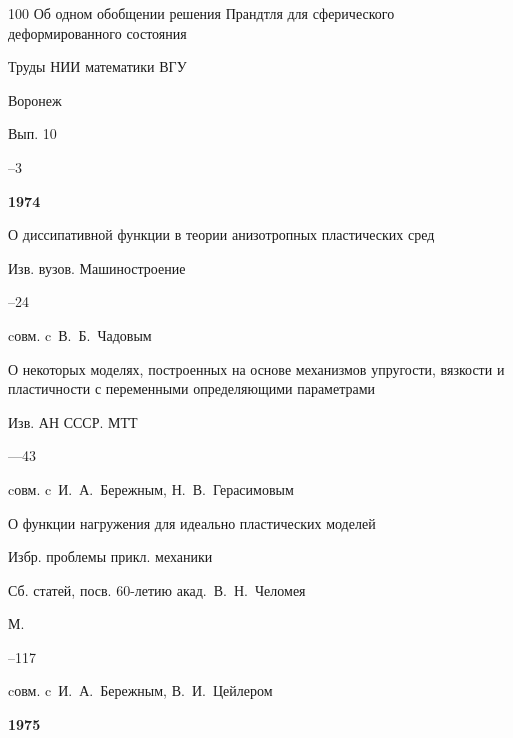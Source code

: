 \begin{thebibliography}{100}
\paper  Об одном обобщении решения Прандтля для сферического деформированного состояния 

\inbook Труды НИИ математики ВГУ

\publaddr Воронеж


\issueinfo Вып. 10

–3



\item[] \centerline{\bf 1974}




\paper О диссипативной функции в теории анизотропных пластических сред 

\jour Изв. вузов. Машиностроение



–24 

\miscnote cовм. c~В.~Б.~Чадовым






\paper О некоторых моделях, построенных на основе механизмов упругости, вязкости и пластичности с переменными определяющими параметрами 

\jour Изв. АН СССР. МТТ



—43 

\miscnote cовм. c~И.~А.~Бережным, Н.~В.~Герасимовым




\paper О функции нагружения для идеально пластических моделей 

\inbook Избр. проблемы прикл. механики

\bookinfo Сб. статей, посв. 60-летию акад.~В.~Н.~Челомея

\publaddr М.


–117 

\miscnote cовм. c~И.~А.~Бережным, В.~И.~Цейлером



\item[] \centerline{\bf 1975}





\end{thebibliography}
